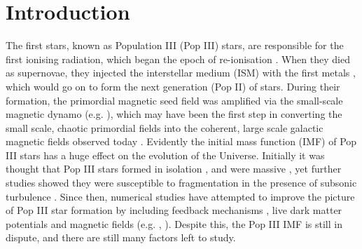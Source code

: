 \documentclass[fleqn,usenatbib]{mnras}
\begin{document}

\section{Introduction}
The first stars, known as Population III (Pop III) stars, are responsible for the first ionising radiation, which began the epoch of re-ionisation \citep{Bromm2001}. When they died as supernovae, they injected the interstellar medium (ISM) with the first metals \citep{Heger2003}, which would go on to form the next generation (Pop II) of stars. During their formation, the primordial magnetic seed field was amplified via the small-scale magnetic dynamo (e.g. \citealt{Schober2012}), which may have been the first step in converting the small scale, chaotic primordial fields into the coherent, large scale galactic magnetic fields observed today \citep{Kulsrud1990}. Evidently the initial mass function (IMF) of Pop III stars has a huge effect on the evolution of the Universe. Initially it was thought that Pop III stars formed in isolation \citep{Haiman1996}, and were massive \citep{Bromm1999}, yet further studies showed they were susceptible to fragmentation in the presence of subsonic turbulence \citep{Clark2011}. Since then, numerical studies have attempted to improve the picture of Pop III star formation by including feedback mechanisms \citep{OShea2008}, live dark matter potentials \citep{Stacy2014} and magnetic fields (e.g. \citealt{Machida2008a}, \citealt{Sharda2020}). Despite this, the Pop III IMF is still in dispute, and there are still many factors left to study.
\end{document}
